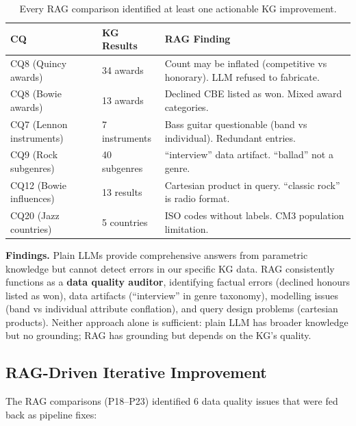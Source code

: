 \documentclass[11pt,a4paper]{article}
\begin{document}
\begin{table}[h]
\centering
\small
\begin{tabular}{llp{6.5cm}}
\toprule
\textbf{CQ} & \textbf{KG Results} & \textbf{RAG Finding} \\
\midrule
CQ8 (Quincy awards) & 34 awards & Count may be inflated (competitive vs honorary). LLM refused to fabricate. \\
CQ8 (Bowie awards) & 13 awards & Declined CBE listed as won. Mixed award categories. \\
CQ7 (Lennon instruments) & 7 instruments & Bass guitar questionable (band vs individual). Redundant entries. \\
CQ9 (Rock subgenres) & 40 subgenres & ``interview'' data artifact. ``ballad'' not a genre. \\
CQ12 (Bowie influences) & 13 results & Cartesian product in query. ``classic rock'' is radio format. \\
CQ20 (Jazz countries) & 5 countries & ISO codes without labels. CM3 population limitation. \\
\bottomrule
\end{tabular}
\caption{Every RAG comparison identified at least one actionable KG improvement.}
\end{table}

\textbf{Findings.} Plain LLMs provide comprehensive answers from parametric knowledge but cannot detect errors in our specific KG data. RAG consistently functions as a \textbf{data quality auditor}, identifying factual errors (declined honours listed as won), data artifacts (``interview'' in genre taxonomy), modelling issues (band vs individual attribute conflation), and query design problems (cartesian products). Neither approach alone is sufficient: plain LLM has broader knowledge but no grounding; RAG has grounding but depends on the KG's quality.

\subsection{RAG-Driven Iterative Improvement}

The RAG comparisons (P18--P23) identified 6 data quality issues that were fed back as pipeline fixes:
\end{document}
